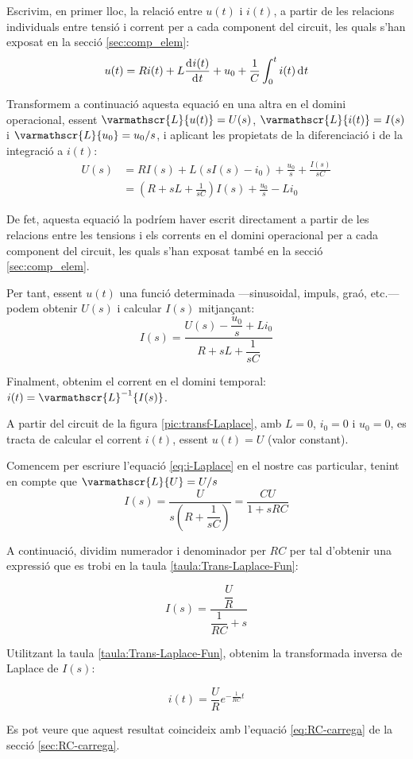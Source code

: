 Escrivim, en primer lloc,  la relació entre $u(t)$ i $i(t)$, a partir
de les relacions individuals entre tensió i corrent per a cada
component del circuit, les quals s'han exposat en la secció
\vref{sec:comp_elem}:
\begin{equation}
    u(t) = R i(t) + L \frac{\diff i(t)}{\diff t} + u_0 + \frac{1}{C}
    \int_0^t i(t) \diff t
\end{equation}

Transformem a continuació aquesta equació en una altra en el domini
operacional, essent $\varmathscr{L}\{u(t)\} = U(s)$,
$\varmathscr{L}\{i(t)\} = I(s)$ i $\varmathscr{L}\{u_0\} =
u_0/s$, i aplicant les propietats de la diferenciació i de la
integració a $i(t)$:
\begin{equation}\begin{split}
    U(s) &= R I(s) + L(s I(s) -i_0) + \frac{u_0}{s} + \frac{I(s)}{s
    C} \\[1ex]
    &= \left( R + s L +\frac{1}{s C}\right)I(s) + \frac{u_0}{s} - L i_0
\end{split}\end{equation}

De fet, aquesta equació la podríem haver escrit directament a
partir de les relacions entre les tensions i els corrents en el
domini operacional per a cada  component del circuit, les quals
s'han exposat també en la secció \vref{sec:comp_elem}.

Per tant, essent $u(t)$  una funció determinada  ---sinusoidal, impuls,
graó, etc.--- podem obtenir $U(s)$ i calcular $I(s)$ mitjançant:
\begin{equation}
    I(s) = \frac{U(s)-\dfrac{u_0}{s} + L i_0}{R + s L
    +\dfrac{1}{s C}}\label{eq:i-Laplace}
\end{equation}

Finalment, obtenim el corrent en el domini temporal: $i(t) =
\varmathscr{L}^{-1}\{I(s)\}$.

	
\begin{exemple}[\ResCircRC{}]
	\addcontentsxms{\ResCircRC}
    A partir del circuit de la figura \vref{pic:transf-Laplace}, amb
    $L=0$, $i_0=0$ i $u_0=0$, es tracta de calcular el corrent $i(t)$,
    essent $u(t)=U$ (valor constant).

    Comencem per escriure l'equació \eqref{eq:i-Laplace} en el nostre
    cas particular, tenint en compte que $\varmathscr{L}\{U\} = U/s$
    \[
        I(s) = \frac{U}{s\left(R + \dfrac{1}{s C}\right)} = \frac{C U}{1 + s R C}
    \]

    A continuació, dividim numerador i denominador per $R C$ per tal
    d'obtenir una expressió que es trobi en la taula
    \vref{taula:Trans-Laplace-Fun}:

    \[
        I(s) = \frac{\dfrac{U}{R}}{\dfrac{1}{R C} + s}
    \]

    Utilitzant la taula \vref{taula:Trans-Laplace-Fun}, obtenim la transformada inversa de Laplace de $I(s)$:

    \[
        i(t) = \frac{U}{R} e^{-\frac{1}{R C}t}
    \]

    Es pot veure que aquest resultat coincideix amb l'equació \eqref{eq:RC-carrega} de la secció \vref{sec:RC-carrega}.
\end{exemple}

